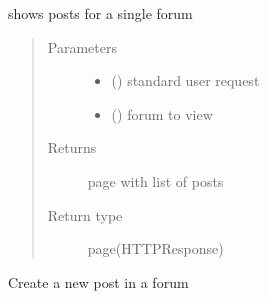 \documentclass[letterpaper,10pt,english]{sphinxmanual}
\begin{document}
\begin{fulllineitems}
\label{\detokenize{forums:forums.views.post_list_single_forum}}
shows posts for a single forum
\begin{quote}\begin{description}
\item[{Parameters}] \leavevmode\begin{itemize}
\item {} 
 () \textendash{} standard user request

\item {} 
 () \textendash{} forum to view

\end{itemize}

\item[{Returns}] \leavevmode
page with list of posts

\item[{Return type}] \leavevmode
page(HTTPResponse)

\end{description}\end{quote}

\end{fulllineitems}


\begin{fulllineitems}
\label{\detokenize{forums:forums.views.post_new}}
Create a new post in a forum

\end{fulllineitems}


\begin{fulllineitems}
\label{\detokenize{forums:forums.views.post_search}}
\end{fulllineitems}
\end{document}
